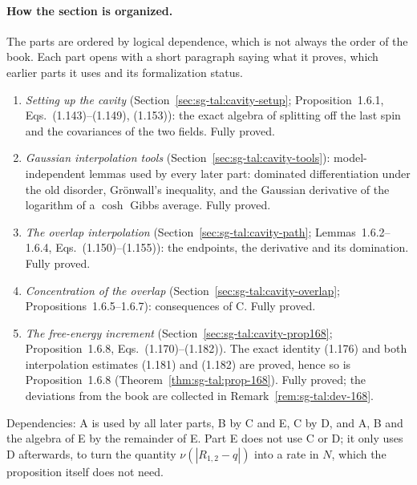 \paragraph{How the section is organized.}
The parts are ordered by logical dependence, which is not always the order of the book.
Each part opens with a short paragraph saying what it proves, which earlier parts it uses and its
formalization status.
\begin{enumerate}
\item[A.] \emph{Setting up the cavity} (Section~\ref{sec:sg-tal:cavity-setup}; Proposition~1.6.1,
  Eqs.~(1.143)--(1.149), (1.153)): the exact algebra of splitting off the last spin and the
  covariances of the two fields.  Fully proved.
\item[B.] \emph{Gaussian interpolation tools} (Section~\ref{sec:sg-tal:cavity-tools}): model-independent
  lemmas used by every later part: dominated differentiation under the old disorder, Gr\"onwall's
  inequality, and the Gaussian derivative of the logarithm of a $\cosh$ Gibbs average.  Fully proved.
\item[C.] \emph{The overlap interpolation} (Section~\ref{sec:sg-tal:cavity-path}; Lemmas~1.6.2--1.6.4,
  Eqs.~(1.150)--(1.155)): the endpoints, the derivative and its domination.  Fully proved.
\item[D.] \emph{Concentration of the overlap} (Section~\ref{sec:sg-tal:cavity-overlap};
  Propositions~1.6.5--1.6.7): consequences of C.  Fully proved.
\item[E.] \emph{The free-energy increment} (Section~\ref{sec:sg-tal:cavity-prop168};
  Proposition~1.6.8, Eqs.~(1.170)--(1.182)).  The exact identity (1.176) and both interpolation
  estimates (1.181) and (1.182) are proved, hence so is Proposition~1.6.8 (Theorem~\ref{thm:sg-tal:prop-168}).
  Fully proved; the deviations from the book are collected in Remark~\ref{rem:sg-tal:dev-168}.
\end{enumerate}
Dependencies: A is used by all later parts, B by C and E, C by D, and A, B and the algebra of E
by the remainder of E.  Part E does not use C or D; it only uses D afterwards, to turn the
quantity $\nu(|R_{1,2}-q|)$ into a rate in $N$, which the proposition itself does not need.

